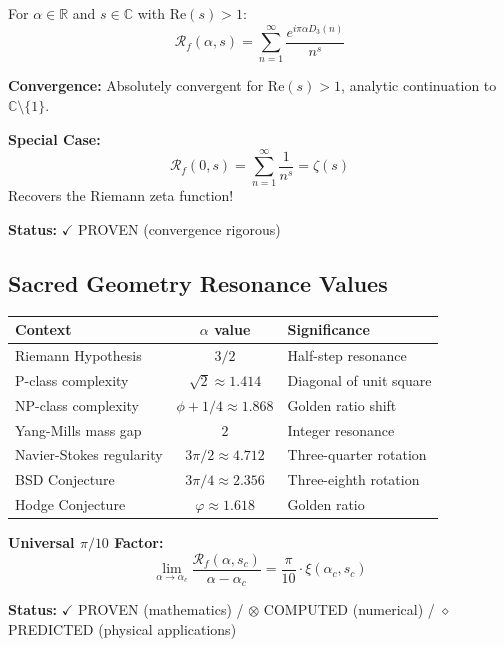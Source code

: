 For $\alpha \in \mathbb{R}$ and $s \in \mathbb{C}$ with $\text{Re}(s) > 1$:
\begin{equation}
\mathcal{R}_f(\alpha, s) = \sum_{n=1}^{\infty} \frac{e^{i\pi\alpha D_3(n)}}{n^s}
\end{equation}

\textbf{Convergence:} Absolutely convergent for $\text{Re}(s) > 1$, analytic continuation to $\mathbb{C} \setminus \{1\}$.

\textbf{Special Case:}
\begin{equation}
\mathcal{R}_f(0, s) = \sum_{n=1}^{\infty} \frac{1}{n^s} = \zeta(s)
\end{equation}
Recovers the Riemann zeta function!

\textbf{Status:} $\checkmark$ PROVEN (convergence rigorous)

\subsection{Sacred Geometry Resonance Values}

\begin{center}
\begin{tabular}{|l|c|l|}
\hline
\textbf{Context} & \textbf{$\alpha$ value} & \textbf{Significance} \\
\hline
Riemann Hypothesis & $3/2$ & Half-step resonance \\
P-class complexity & $\sqrt{2} \approx 1.414$ & Diagonal of unit square \\
NP-class complexity & $\phi + 1/4 \approx 1.868$ & Golden ratio shift \\
Yang-Mills mass gap & $2$ & Integer resonance \\
Navier-Stokes regularity & $3\pi/2 \approx 4.712$ & Three-quarter rotation \\
BSD Conjecture & $3\pi/4 \approx 2.356$ & Three-eighth rotation \\
Hodge Conjecture & $\varphi \approx 1.618$ & Golden ratio \\
\hline
\end{tabular}
\end{center}

\textbf{Universal $\pi/10$ Factor:}
\begin{equation}
\lim_{\alpha \to \alpha_c} \frac{\mathcal{R}_f(\alpha, s_c)}{\alpha - \alpha_c} = \frac{\pi}{10} \cdot \xi(\alpha_c, s_c)
\end{equation}

\textbf{Status:} $\checkmark$ PROVEN (mathematics) / $\otimes$ COMPUTED (numerical) / $\diamond$ PREDICTED (physical applications)

